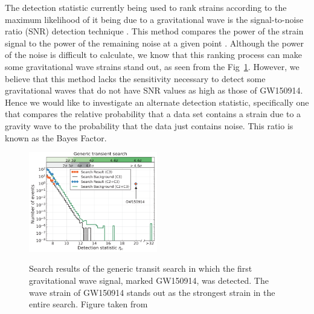 \documentclass{article}
\begin{document}
  
  \indent The detection statistic currently being used to rank strains according to the maximum likelihood of it being due to a gravitational wave is the signal-to-noise ratio (SNR) detection technique \cite{Enia}. This method compares the power of the strain signal to the power of the remaining noise at a given point \cite{RSmith}. Although the power of the noise is difficult to calculate, we know that this ranking process can make some gravitational wave strains stand out, as seen from the Fig~\ref{Fig:Detection}.  However, we believe that this method lacks the sensitivity necessary to detect some gravitational waves that do not have SNR values as high as those of GW150914. Hence we would like to investigate an alternate detection statistic, specifically one that compares the relative probability that a data set contains a strain due to a gravity wave to the probability that the data just contains noise. This ratio is known as the Bayes Factor. %
  
\begin{figure}[h]
	\caption{Search results of the generic transit search in which the first gravitational wave signal, marked GW150914, was detected. The wave strain of GW150914 stands out as the strongest strain in the entire search. Figure taken from \cite{DetectionPaper}}
	\centering
	\includegraphics[width=0.5\textwidth]{DetectionInGenericTransientSearch} \label{Fig:Detection}
\end{figure}

 
 
\end{document}
